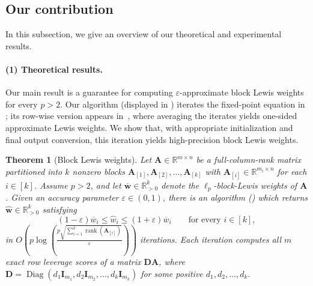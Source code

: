 \documentclass[11pt]{article}
\theoremstyle{plain}
\newtheorem{theorem}{Theorem}[section]
\numberwithin{equation}{section}
\newcommand{\R}{\mathbb{R}}
\newcommand{\Diag}{\operatorname{Diag}}
\newcommand{\rank}{\operatorname{rank}}
\newcommand{\eps}{\varepsilon}
\newcommand{\Rkpos}{\mathbb{R}_{>0}^k}
\newcommand{\bA}{\mathbf{A}}
\newcommand{\bD}{\mathbf{D}}
\newcommand{\bI}{\mathbf{I}}
\newcommand{\bwhat}{\widehat{\mathbf{w}}}
\newcommand{\bwbar}{\overline{\mathbf{w}}}
\newcommand{\bAblk}[1]{\mathbf{A}_{[#1]}}
\newcommand{\what}{\widehat{w}}
\newcommand{\wbar}{\overline{w}}
\begin{document}
\subsection{Our contribution}
\label{sec:intro-contribution}
In this subsection, we give an overview of our theoretical and experimental results. 

\paragraph{(1) Theoretical results.}  
Our main result is a guarantee for computing $\varepsilon$-approximate block Lewis weights for every $p>2$. 
Our algorithm (displayed in ) iterates the fixed-point equation in ; its row-wise version appears in~\cite[Algorithm~6]{lee2016faster}, where averaging the iterates yields one-sided approximate Lewis weights.  
We show that, with appropriate initialization and final output conversion, this iteration yields high-precision block Lewis weights.

\begin{theorem}[Block Lewis weights]\label{thm:blkLW}
Let $\bA\in\R^{m\times n}$ be a full-column-rank matrix partitioned into $k$ nonzero blocks $\bAblk{1}, \bAblk{2}, \ldots,\bAblk{k}$ with $\bAblk{i}\in\R^{m_i\times n}$ for each $i\in [k]$. Assume  $p>2$, and let $\bwbar\in\Rkpos$ denote the $\ell_p$-block-Lewis weights of $\bA$. Given an accuracy parameter $\eps\in(0,1)$, there is an algorithm () which returns $\bwhat\in\Rkpos$ satisfying
\[
  (1-\eps)\wbar_i
  \le \what_i
  \le (1+\eps)\wbar_i
  \qquad\text{for every }i\in[k],
\]
in $O\left(
    p\log\left(\frac{p \sqrt{\sum_{i=1}^k \rank\left(\bAblk{i}\right)}}{\eps}\right)\right)$  iterations. Each iteration computes all $m$ exact row leverage scores of a matrix $\bD\bA$, where $\bD = \Diag\left(d_1\bI_{m_1}, d_2\bI_{m_2}, \dotsc, d_k\bI_{m_k}\right)$ for some positive $d_1, d_2, \dotsc, d_k$. 
\end{theorem}
\end{document}
